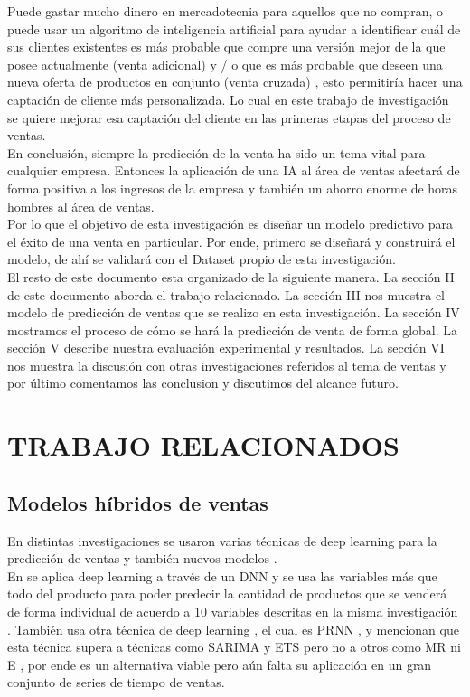 \documentclass[conference]{IEEEtran}
\begin{document}
Puede gastar mucho dinero en mercadotecnia para aquellos que no compran, o puede usar un algoritmo de inteligencia artificial para ayudar a 
identificar cuál de sus clientes existentes es más probable que compre una versión mejor de la que posee actualmente (venta adicional) y / o 
que es más probable que deseen una nueva oferta de productos en conjunto (venta cruzada) \cite{b19}, esto permitiría hacer una captación de 
cliente más personalizada. Lo cual en este trabajo de investigación se quiere mejorar esa captación del cliente en las primeras etapas del 
proceso de ventas.\\

En conclusión, siempre la predicción de la venta ha sido un tema vital para cualquier empresa. Entonces la aplicación de una IA al área de 
ventas afectará de forma positiva a los ingresos de la empresa y también un ahorro enorme de horas hombres al área de ventas.\\

Por lo que el objetivo de esta investigación es diseñar un modelo predictivo para el éxito de una venta en particular. Por ende, 
primero se diseñará y construirá el modelo, de ahí se validará con el Dataset propio de esta investigación.\\

El resto de este documento esta organizado de la siguiente manera. 
La sección II de este documento aborda el trabajo relacionado. 
La sección III nos muestra el modelo de predicción de ventas que se realizo en esta investigación. 
La sección IV mostramos el proceso de cómo se hará la predicción de venta de forma global. 
La sección V describe nuestra evaluación experimental y resultados. 
La sección VI nos muestra la discusión con otras investigaciones referidos al tema de ventas y por último comentamos las conclusion y 
discutimos del alcance futuro.
\section{TRABAJO RELACIONADOS}

\subsection{Modelos híbridos de ventas}
En distintas investigaciones se usaron varias técnicas de deep learning para la predicción de ventas \cite{b1} \cite{b2} y también nuevos 
modelos \cite{b5} \cite{b6} \cite{b7}.\\
En \cite{b1} se aplica deep learning a través de un DNN y se usa las variables más que todo del producto para poder predecir la cantidad de 
productos que se venderá de forma individual de acuerdo a 10 variables descritas en la misma investigación \cite{b1}. 
También \cite{b2} usa otra técnica de deep learning , el cual es PRNN , y mencionan que esta técnica supera a técnicas como SARIMA y ETS 
pero no a otros como MR ni E , por ende es un alternativa viable pero aún falta su aplicación en un gran conjunto de series de tiempo de ventas.\\
\end{document}
